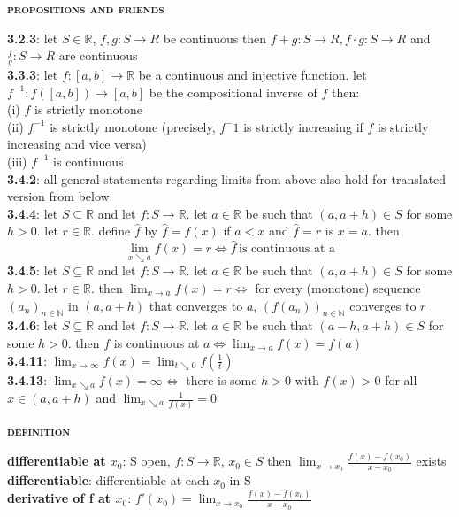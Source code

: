 \documentclass[a4paper]{article}
\begin{document}
\begin{multicols}{2}
\begin{framed}
	\begin{center}
		\textbf{\textsc{propositions and friends}}
	\end{center}
	\textbf{3.2.3}: let $S \in \mathbb{R}$, $f, g: S \rightarrow R$ be continuous then $f+g: S \rightarrow R, f \cdot g:S \rightarrow R$ and $\frac{f}{g}:S \rightarrow R$ are continuous\\
	\textbf{3.3.3}: let $f:[a,b]\rightarrow \mathbb{R}$ be a continuous and injective function. let $f^{-1}:f([a,b]) \rightarrow [a,b]$ be the compositional inverse of $f$ then:\\
	(i) $f$ is strictly monotone\\
	(ii) $f^{-1}$ is strictly monotone (precisely, $f^-1$ is strictly increasing if $f$ is strictly increasing and vice versa)\\
	(iii) $f^{-1}$ is continuous\\
	\textbf{3.4.2}: all general statements regarding limits from above also hold for translated version from below\\
	\textbf{3.4.4}: let $S \subseteq \mathbb{R}$ and let $f: S \rightarrow \mathbb{R}$. let $a \in \mathbb{R}$ be such that $(a, a+h)\in S$ for some $h > 0$. let $r \in \mathbb{R}$. define $\hat{f}$ by $\hat{f} = f(x)$ if $a < x$ and $\hat{f} = r$ is $x = a$. then
	$$ \lim_{x \searrow a} f(x) = r \iff \hat{f} \, \text{is continuous at a}$$
	\textbf{3.4.5}: let $S \subseteq \mathbb{R}$ and let $f: S \rightarrow \mathbb{R}$. let $a \in \mathbb{R}$ be such that $(a, a+h)\in S$ for some $h > 0$. let $r \in \mathbb{R}$. then $\lim_{x \rightarrow a}f(x) = r \iff$ for every (monotone) sequence $(a_n)_{n \in \mathbb{N}}$ in $(a, a+h)$ that converges to $a$, $(f(a_n))_{n \in \mathbb{N}}$ converges to $r$\\
	\textbf{3.4.6}: let $S \subseteq \mathbb{R}$ and let $f: S \rightarrow \mathbb{R}$. let $a \in \mathbb{R}$ be such that $(a-h, a+h)\in S$ for some $h > 0$. then $f$ is continuous at $a \iff \lim_{x \rightarrow a}f(x) = f(a)$\\
	\textbf{3.4.11}: $\lim_{x \rightarrow \infty}f(x) = \lim_{t \searrow 0}f(\frac{1}{t})$\\
	\textbf{3.4.13}: $\lim_{x \searrow a}f(x) = \infty \iff$ there is some $h > 0$ with $f(x) > 0$ for all $x \in (a, a+h)$ and $\lim_{x \searrow a}\frac{1}{f(x)} = 0$
\end{framed}

\newpage
\begin{framed}
	\begin{center}
		\textbf{\textsc{definition}}
	\end{center}
	\textbf{differentiable at $x_0$}: S open, $f: S \rightarrow \mathbb{R}$, $x_0 \in S$ then $\lim_{x \rightarrow x_0} \frac{f(x) - f(x_0)}{x - x_0}$ exists\\
	\textbf{differentiable}: differentiable at each $x_0$ in S\\
	\textbf{derivative of f at $x_0$}: $f'(x_0) = \lim_{x \rightarrow x_0} \frac{f(x) - f(x_0)}{x - x_0}$\\
	

\end{framed}
\end{multicols}
\end{document}
